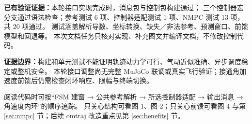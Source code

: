 \documentclass[UTF8,a4paper,11pt,fontset=fandol]{ctexart}
\newcommand{\note}[1]{\par\noindent\colorbox{panel}{\parbox{\dimexpr\linewidth-2\fboxsep}{#1}}\par}
\begin{document}
\textbf{已有验证证据：}本轮接口实现完成时，消息包与控制包构建通过；
三个控制器宏分支通过语法检查；参考测试 6 项、控制器适配测试 1 项、NMPC 测试 13 项，共 20 项通过。
测试涵盖解析导数、坐标转换、缺失／非法参考、预测窗口、前馈模型和回退等。
本次文档任务只核对实现、补充图文并编译文档，不修改控制代码。

\textbf{证据边界：}构建和单元测试不能证明轨迹动力学可行、气动近似准确、异步调度稳定或整机安全。
本轮接口调整尚无完整 MuJoCo 联调或真实飞行验证；接通角加速度前馈后仍需检查闭环响应、限幅与终端切换。

\note{阅读代码时可按“FSM 建窗 → 公共参考解析 → 所选控制器适配 → 输出消息 → 角速度内环”的顺序追踪。
只关心结构可看图 1、图 2；只关心前馈可看图 4 与第 \ref{sec:nmpc} 节；后续 omtraj 改造重点见第 \ref{sec:benefits} 节。}
\end{document}
